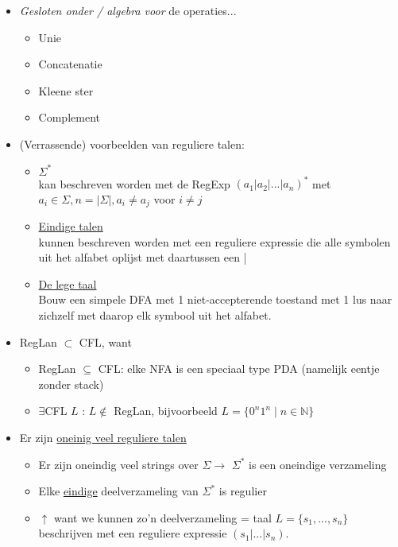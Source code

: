\documentclass[kulak]{kulakarticle}
\newcommand{\N}{\mathbb{N}}
\newcommand{\abs}[1]{\lvert #1 \rvert}
\theoremstyle{definition}
\begin{document}
	\begin{itemize}
		\item \textit{Gesloten onder / algebra voor} de operaties... \begin{itemize}
			\item Unie
			\item Concatenatie
			\item Kleene ster
			\item Complement
		\end{itemize}
		\item (Verrassende) voorbeelden van reguliere talen:
		\begin{itemize}
			\item \underline{\(\Sigma^*\)}\\
			kan beschreven worden met de RegExp \((a_1|a_2|...|a_n)^*\) met \(a_i\in \Sigma, n=\abs{\Sigma}, a_i\neq a_j\) voor \(i\neq j\)
			\item \underline{Eindige talen}\\
			kunnen beschreven worden met een reguliere expressie die alle symbolen uit het alfabet oplijst met daartussen een |
			\item \underline{De lege taal}\\
			Bouw een simpele DFA met 1 niet-accepterende toestand met 1 lus naar zichzelf met daarop elk symbool uit het alfabet.
		\end{itemize}
		\item RegLan \(\subset\) CFL, want
		\begin{itemize}
			\item RegLan \(\subseteq\) CFL: elke NFA is een speciaal type PDA (namelijk eentje zonder stack)
			\item \(\exists\)CFL \(L\) : \(L \notin \) RegLan, bijvoorbeeld \(L=\{0^n1^n \mid n\in\N\}\)
		\end{itemize}
		\item Er zijn \underline{oneinig veel reguliere talen} \begin{itemize}
			\item Er zijn oneindig veel strings over \(\Sigma \rightarrow\) \(\Sigma^*\) is een oneindige verzameling
			\item Elke \underline{eindige} deelverzameling van \(\Sigma^*\) is regulier
			\item \(\uparrow\) want we kunnen zo'n deelverzameling = taal \(L=\{s_1,...,s_n\}\) beschrijven met een reguliere expressie \((s_1|...|s_n)\).
		\end{itemize}
	\end{itemize}
\end{document}
